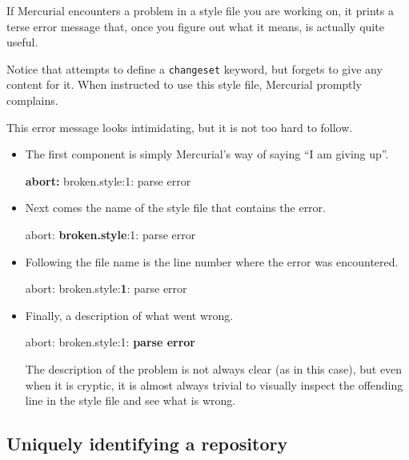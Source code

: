 {{If Mercurial encounters a problem in a style file you are working on,
it prints a terse error message that, once you figure out what it
means, is actually quite useful.


Notice that  attempts to define a
\texttt{changeset} keyword, but forgets to give any content for it.
When instructed to use this style file, Mercurial promptly complains.


This error message looks intimidating, but it is not too hard to
follow.

\begin{itemize}
\item The first component is simply Mercurial's way of saying ``I am
  giving up''.
  \begin{codesample4}
    \textbf{abort:} broken.style:1: parse error
  \end{codesample4}

\item Next comes the name of the style file that contains the error.
  \begin{codesample4}
    abort: \textbf{broken.style}:1: parse error
  \end{codesample4}

\item Following the file name is the line number where the error was
  encountered.
  \begin{codesample4}
    abort: broken.style:\textbf{1}: parse error
  \end{codesample4}

\item Finally, a description of what went wrong.
  \begin{codesample4}
    abort: broken.style:1: \textbf{parse error}
  \end{codesample4}
  The description of the problem is not always clear (as in this
  case), but even when it is cryptic, it is almost always trivial to
  visually inspect the offending line in the style file and see what
  is wrong.
\end{itemize}

\subsection{Uniquely identifying a repository}

}}
